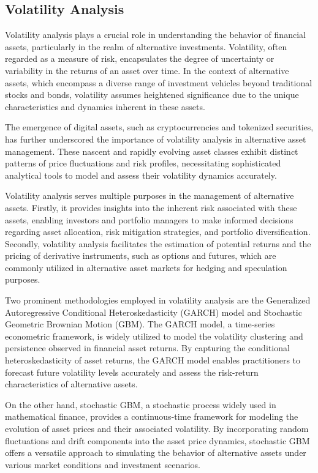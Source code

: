 \subsection{Volatility Analysis}

Volatility analysis plays a crucial role in understanding the behavior of financial assets, particularly in the realm of alternative investments. Volatility, often regarded as a measure of risk, encapsulates the degree of uncertainty or variability in the returns of an asset over time. In the context of alternative assets, which encompass a diverse range of investment vehicles beyond traditional stocks and bonds, volatility assumes heightened significance due to the unique characteristics and dynamics inherent in these assets.

The emergence of digital assets, such as cryptocurrencies and tokenized securities, has further underscored the importance of volatility analysis in alternative asset management. These nascent and rapidly evolving asset classes exhibit distinct patterns of price fluctuations and risk profiles, necessitating sophisticated analytical tools to model and assess their volatility dynamics accurately.

Volatility analysis serves multiple purposes in the management of alternative assets. Firstly, it provides insights into the inherent risk associated with these assets, enabling investors and portfolio managers to make informed decisions regarding asset allocation, risk mitigation strategies, and portfolio diversification. Secondly, volatility analysis facilitates the estimation of potential returns and the pricing of derivative instruments, such as options and futures, which are commonly utilized in alternative asset markets for hedging and speculation purposes.

Two prominent methodologies employed in volatility analysis are the Generalized Autoregressive Conditional Heteroskedasticity (GARCH) model and Stochastic Geometric Brownian Motion (GBM). The GARCH model, a time-series econometric framework, is widely utilized to model the volatility clustering and persistence observed in financial asset returns. By capturing the conditional heteroskedasticity of asset returns, the GARCH model enables practitioners to forecast future volatility levels accurately and assess the risk-return characteristics of alternative assets.

On the other hand, stochastic GBM, a stochastic process widely used in mathematical finance, provides a continuous-time framework for modeling the evolution of asset prices and their associated volatility. By incorporating random fluctuations and drift components into the asset price dynamics, stochastic GBM offers a versatile approach to simulating the behavior of alternative assets under various market conditions and investment scenarios.

